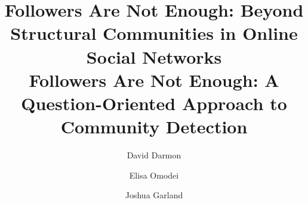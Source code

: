 \documentclass[letterpaper,margin
]{article}
\begin{document}
\title{Followers Are Not Enough: Beyond Structural Communities in Online Social Networks \\Followers Are Not Enough: A Question-Oriented Approach to Community Detection}


 \author[1]{David Darmon}
 \author[2]{Elisa Omodei}
 \author[3]{Joshua Garland}



\maketitle


 
 
 
 

 

\maketitle
\end{document}

